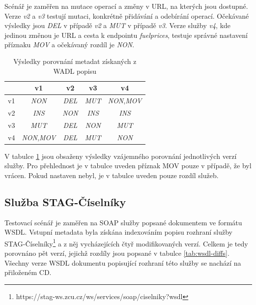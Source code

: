 \documentclass[czech,DP]{thesiskiv}
\begin{document}
Scénář je zaměřen na mutace operací a změny v URL, na kterých jsou dostupné. Verze \textit{v2} a \textit{v3} testují mutaci, konkrétně přidávání a odebírání operací. Očekávané výsledky jsou \textit{DEL} v případě \textit{v2} a \textit{MUT} v případě \textit{v3}. Verze služby \textit{v4}, kde jedinou změnou je URL a cesta k endpointu \textit{fuelprices}, testuje správné nastavení příznaku \textit{MOV} a očekávaný rozdíl je \textit{NON}.

\begin{table}[h]
	\centering
	\begin{tabular}{|l||c|c|c|c|}
		\hline
		& v1 & v2 & v3 & v4 \\
		\hline
		\hline
		v1 & \textit{NON} & \textit{DEL} & \textit{MUT} & \textit{NON},\textit{MOV} \\
		\hline
		v2 & \textit{INS} & \textit{NON} & \textit{INS} & \textit{INS} \\
		\hline
		v3 & \textit{MUT} & \textit{DEL} & \textit{NON} & \textit{MUT} \\
		\hline
		v4 & \textit{NON},\textit{MOV} & \textit{DEL} & \textit{MUT} & \textit{NON} \\
		\hline
	\end{tabular}
	\caption{Výsledky porovnání metadat získaných z WADL popisu}
	\label{tab:wadl-cmp-res}
\end{table} 

V tabulce \ref{tab:wadl-cmp-res} jsou obsaženy výsledky vzájemného porovnání jednotlivých verzí služby. Pro přehlednost je v tabulce uveden příznak MOV pouze v případě, že byl vrácen. Pokud nastaven nebyl, je v tabulce uveden pouze rozdíl služeb. 

\subsection{Služba STAG-Číselníky}

Testovací scénář je zaměřen na SOAP služby popsané dokumentem ve formátu WSDL. Vstupní metadata byla získána indexováním popisu rozhraní služby STAG-Číselníky\footnote{https://stag-ws.zcu.cz/ws/services/soap/ciselniky?wsdl} a z něj vycházejících čtyř modifikovaných verzí. Celkem je tedy porovnáno pět verzí, jejichž rozdíly jsou popsané v tabulce \ref{tab:wsdl-diffs}. Všechny verze WSDL dokumentu popisující rozhraní této služby se nachází na přiloženém CD.
\end{document}
